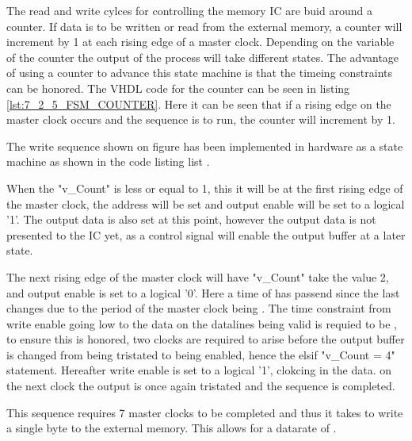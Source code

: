 The read and write cylces for controlling the memory IC are buid around a counter. If data is to be written or read from the external memory, a counter will increment by 1 at each rising edge of a  master clock. Depending on the variable of the counter the output of the process will take different states. The advantage of using a counter to advance this state machine is that the timeing constraints can be honored. The VHDL code for the counter can be seen in listing \ref{lst:7_2_5_FSM_COUNTER}. Here it can be seen that if a rising edge on the master clock occurs and the sequence is to run, the counter will increment by 1.



The write sequence shown on figure  has been implemented in hardware as a state machine as shown in the code listing list .



When the "v\_Count" is less or equal to 1, this it will be at the first rising edge of the master clock, the address will be set and output enable will be set to a logical '1'. The output data is also set at this point, however the output data is not presented to the IC yet, as a control signal will enable the output buffer at a later state. 

The next rising edge of the master clock will have "v\_Count" take the value 2, and output enable is set to a logical '0'. Here a time of  has passend since the last changes due to the period of the master clock being . The time constraint from write enable going low to the data on the datalines being valid is requied to be , to ensure this is honored, two clocks are required to arise before the output buffer is changed from being tristated to being enabled, hence the elsif "v\_Count = 4" statement. Hereafter write enable is set to a logical '1', clokcing in the data. on the next clock the output is once again tristated and the sequence is completed. 

This sequence requires 7 master clocks to be completed and thus it takes  to write a single byte to the external memory. This allows for a datarate of .


